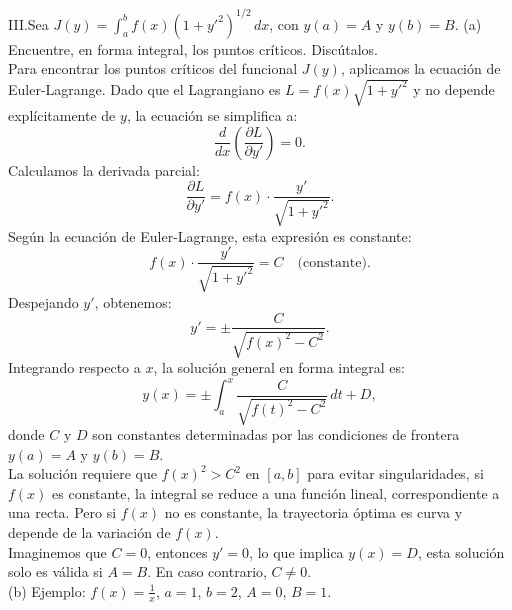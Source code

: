 \documentclass{elsarticle}
\begin{document}
III.Sea \( J(y) = \int_{a}^{b} f(x)(1 + y'^{2})^{1/2} \, dx \), con \( y(a) = A \) y \( y(b) = B \).  
(a) Encuentre, en forma integral, los puntos críticos. Discútalos. \\

Para encontrar los puntos críticos del funcional \( J(y) \), aplicamos la ecuación de Euler-Lagrange. Dado que el Lagrangiano es \( L = f(x)\sqrt{1 + y'^2} \) y no depende explícitamente de \( y \), la ecuación se simplifica a:  
\[
\frac{d}{dx} \left( \frac{\partial L}{\partial y'} \right) = 0.
\]  
Calculamos la derivada parcial:  
\[
\frac{\partial L}{\partial y'} = f(x) \cdot \frac{y'}{\sqrt{1 + y'^2}}.
\]  
Según la ecuación de Euler-Lagrange, esta expresión es constante:  
\[
f(x) \cdot \frac{y'}{\sqrt{1 + y'^2}} = C \quad \text{(constante)}.
\]  
Despejando \( y' \), obtenemos:  
\[
y' = \pm \frac{C}{\sqrt{f(x)^2 - C^2}}.
\]  
Integrando respecto a \( x \), la solución general en forma integral es:  
\[
y(x) = \pm \int_{a}^{x} \frac{C}{\sqrt{f(t)^2 - C^2}} \, dt + D,
\]  
donde \( C \) y \( D \) son constantes determinadas por las condiciones de frontera \( y(a) = A \) y \( y(b) = B \).   \\

   La solución requiere que \( f(x)^2 > C^2 \) en \([a, b]\) para evitar singularidades, si \( f(x) \) es constante, la integral se reduce a una función lineal, correspondiente a una recta. Pero si \( f(x) \) no es constante, la trayectoria óptima es curva y depende de la variación de \( f(x) \).  \\
   Imaginemos que \( C = 0 \), entonces \( y' = 0 \), lo que implica \( y(x) = D \), esta solución solo es válida si \( A = B \). En caso contrario, \( C \neq 0 \). \\

   (b) Ejemplo: \( f(x) = \frac{1}{x} \), \( a = 1 \), \( b = 2 \), \( A = 0 \), \( B = 1 \). \\ 
\end{document}
